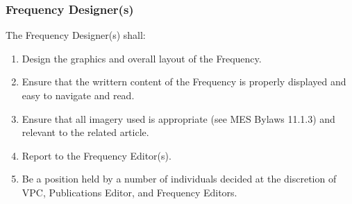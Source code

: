 \subsubsection{Frequency Designer(s)}
\label{frequency-designers}
The Frequency Designer(s) shall: 

\begin{enumerate} 
  \item    
   Design the graphics and overall layout of the Frequency. 
  \item    
   Ensure that the writtern content of the Frequency is properly displayed and easy to navigate and read. 
  \item     
   Ensure that all imagery used is appropriate (see MES Bylaws 11.1.3) and relevant to the related article. 
  \item     
   Report to the Frequency Editor(s). 
  \item     
   Be a position held by a number of individuals decided at the discretion of VPC, Publications Editor, and Frequency Editors. 
\end{enumerate}